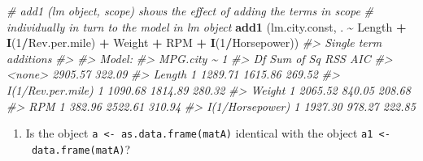 \documentclass[
]{book}
\newenvironment{Shaded}{\begin{snugshade}}{\end{snugshade}}
\newcommand{\CommentTok}[1]{\textcolor[rgb]{0.56,0.35,0.01}{\textit{#1}}}
\newcommand{\DecValTok}[1]{\textcolor[rgb]{0.00,0.00,0.81}{#1}}
\newcommand{\FunctionTok}[1]{\textcolor[rgb]{0.13,0.29,0.53}{\textbf{#1}}}
\newcommand{\NormalTok}[1]{#1}
\newcommand{\SpecialCharTok}[1]{\textcolor[rgb]{0.81,0.36,0.00}{\textbf{#1}}}
\providecommand{\tightlist}{%
  \setlength{\itemsep}{0pt}\setlength{\parskip}{0pt}}
\begin{document}
\begin{Shaded}
\begin{Highlighting}[]
\CommentTok{\# add1 (lm object, scope) shows the effect of adding the terms in scope }
\CommentTok{\# individually in turn to the model in lm object }
\FunctionTok{add1}\NormalTok{ (lm.city.const, . }\SpecialCharTok{\textasciitilde{}}\NormalTok{ Length }\SpecialCharTok{+} \FunctionTok{I}\NormalTok{(}\DecValTok{1}\SpecialCharTok{/}\NormalTok{Rev.per.mile) }\SpecialCharTok{+}\NormalTok{ Weight }\SpecialCharTok{+}\NormalTok{ RPM }\SpecialCharTok{+} 
       \FunctionTok{I}\NormalTok{(}\DecValTok{1}\SpecialCharTok{/}\NormalTok{Horsepower))}
\CommentTok{\#\textgreater{} Single term additions}
\CommentTok{\#\textgreater{} }
\CommentTok{\#\textgreater{} Model:}
\CommentTok{\#\textgreater{} MPG.city \textasciitilde{} 1}
\CommentTok{\#\textgreater{}                   Df Sum of Sq     RSS    AIC}
\CommentTok{\#\textgreater{} \textless{}none\textgreater{}                         2905.57 322.09}
\CommentTok{\#\textgreater{} Length             1   1289.71 1615.86 269.52}
\CommentTok{\#\textgreater{} I(1/Rev.per.mile)  1   1090.68 1814.89 280.32}
\CommentTok{\#\textgreater{} Weight             1   2065.52  840.05 208.68}
\CommentTok{\#\textgreater{} RPM                1    382.96 2522.61 310.94}
\CommentTok{\#\textgreater{} I(1/Horsepower)    1   1927.30  978.27 222.85}
\end{Highlighting}
\end{Shaded}

\begin{enumerate}
\def\labelenumi{(\alph{enumi})}
\setcounter{enumi}{1}
\tightlist
\item
  Is the object \texttt{a\ \textless{}-\ as.data.frame(matA)} identical with the object \texttt{a1\ \textless{}-\ data.frame(matA)}?
\end{enumerate}
\end{document}
